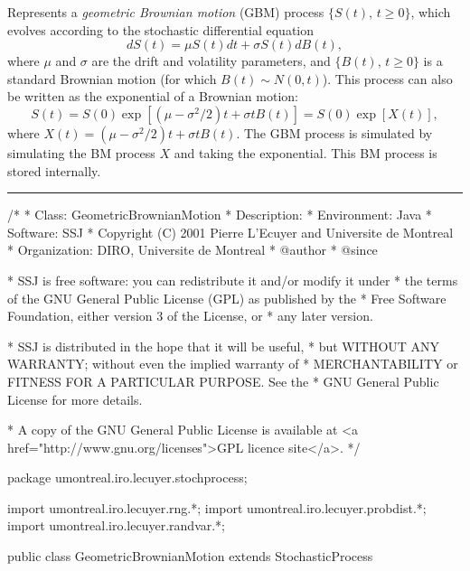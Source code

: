 
Represents a \emph{geometric Brownian motion} (GBM) process $\{S(t),\, t\ge 0\}$,
which evolves according to the stochastic differential equation
\begin{equation}
   dS(t) = \mu S(t) dt + \sigma S(t) dB(t),
                                               \label{eq:GBM}
\end{equation}
where $\mu$ and $\sigma$ are the drift and volatility parameters,
and $\{B(t),\, t\ge 0\}$ is a standard Brownian motion
(for which $B(t)\sim N(0,t)$).
This process can also be written as the exponential of a Brownian motion:
\begin{equation}
  S(t) = S(0) \exp \left[ (\mu - \sigma^{2}/2) t + \sigma t B(t) \right]
       = S(0) \exp \left[ X(t) \right],
                                               \label{eq:GBM2}
\end{equation}
where $X(t) = (\mu - \sigma^{2}/2) t + \sigma t B(t)$.
The GBM process is simulated by simulating the BM process $X$ and taking the exponential.
This BM process is stored internally.

\bigskip\hrule\bigskip

\begin{code}
\begin{hide}
/*
 * Class:        GeometricBrownianMotion
 * Description:
 * Environment:  Java
 * Software:     SSJ
 * Copyright (C) 2001  Pierre L'Ecuyer and Universite de Montreal
 * Organization: DIRO, Universite de Montreal
 * @author
 * @since

 * SSJ is free software: you can redistribute it and/or modify it under
 * the terms of the GNU General Public License (GPL) as published by the
 * Free Software Foundation, either version 3 of the License, or
 * any later version.

 * SSJ is distributed in the hope that it will be useful,
 * but WITHOUT ANY WARRANTY; without even the implied warranty of
 * MERCHANTABILITY or FITNESS FOR A PARTICULAR PURPOSE.  See the
 * GNU General Public License for more details.

 * A copy of the GNU General Public License is available at
   <a href="http://www.gnu.org/licenses">GPL licence site</a>.
 */
\end{hide}
package umontreal.iro.lecuyer.stochprocess;\begin{hide}
import umontreal.iro.lecuyer.rng.*;
import umontreal.iro.lecuyer.probdist.*;
import umontreal.iro.lecuyer.randvar.*;

\end{hide}

public class GeometricBrownianMotion extends StochasticProcess \begin{hide} {

    protected NormalGen      gen;
    protected BrownianMotion bm;   // The underlying BM process X.
    protected double         mu,
                             sigma;
    protected double[]       mudt;
\end{hide}
\end{code}
